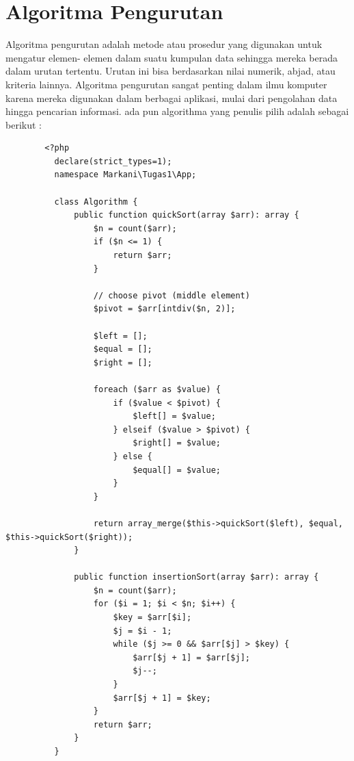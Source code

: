 \documentclass[12pt,a4paper,oneside]{report}
\begin{document}
    \section{Algoritma Pengurutan}
      Algoritma pengurutan adalah metode atau prosedur yang digunakan untuk mengatur elemen- elemen dalam suatu kumpulan data sehingga mereka berada dalam urutan tertentu.
      Urutan ini bisa berdasarkan nilai numerik, abjad, atau kriteria lainnya. Algoritma pengurutan sangat penting dalam ilmu komputer karena mereka digunakan dalam berbagai aplikasi,
      mulai dari pengolahan data hingga pencarian informasi. ada pun algorithma yang penulis pilih adalah sebagai berikut :
      \begin{lstlisting}
        <?php
          declare(strict_types=1);
          namespace Markani\Tugas1\App;

          class Algorithm {
              public function quickSort(array $arr): array {
                  $n = count($arr);
                  if ($n <= 1) {
                      return $arr;
                  }

                  // choose pivot (middle element)
                  $pivot = $arr[intdiv($n, 2)];

                  $left = [];
                  $equal = [];
                  $right = [];

                  foreach ($arr as $value) {
                      if ($value < $pivot) {
                          $left[] = $value;
                      } elseif ($value > $pivot) {
                          $right[] = $value;
                      } else {
                          $equal[] = $value;
                      }
                  }

                  return array_merge($this->quickSort($left), $equal, $this->quickSort($right));
              }

              public function insertionSort(array $arr): array {
                  $n = count($arr);
                  for ($i = 1; $i < $n; $i++) {
                      $key = $arr[$i];
                      $j = $i - 1;
                      while ($j >= 0 && $arr[$j] > $key) {
                          $arr[$j + 1] = $arr[$j];
                          $j--;
                      }
                      $arr[$j + 1] = $key;
                  }
                  return $arr;
              }
          }
      \end{lstlisting}
\end{document}
